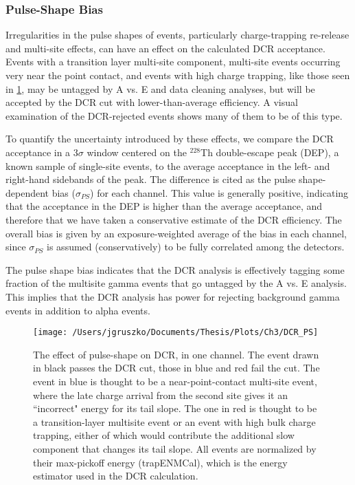 \subsubsection{Pulse-Shape Bias}
Irregularities in the pulse shapes of events, particularly charge-trapping re-release and multi-site effects, can have an effect on the calculated DCR acceptance. Events with a transition layer multi-site component, multi-site events occurring very near the point contact, and events with high charge trapping, like those seen in \ref{fig:DCR_PS}, may be untagged by A vs. E and data cleaning analyses, but will be accepted by the DCR cut with lower-than-average efficiency. A visual examination of the DCR-rejected events shows many of them to be of this type.

To quantify the uncertainty introduced by these effects, we compare the DCR acceptance in a 3$\sigma$ window centered on the $^{228}$Th double-escape peak (DEP), a known sample of single-site events, to the average acceptance in the left- and right-hand sidebands of the peak. The difference is cited as the pulse shape-dependent bias ($\sigma_{PS}$) for each channel. This value is generally positive, indicating that the acceptance in the DEP is higher than the average acceptance, and therefore that we have taken a conservative estimate of the DCR efficiency. The overall bias is given by an exposure-weighted average of the bias in each channel, since $\sigma_{PS}$ is assumed (conservatively) to be fully correlated among the detectors. 

The pulse shape bias indicates that the DCR analysis is effectively tagging some fraction of the multisite gamma events that go untagged by the A vs. E analysis. This implies that the DCR analysis has power for rejecting background gamma events in addition to alpha events.

\begin{figure}[]
 \centering
 \texttt{[image: /Users/jgruszko/Documents/Thesis/Plots/Ch3/DCR\_PS]}
 \caption[Sample waveforms demonstrating the effect of pulse-shape on DCR]{The effect of pulse-shape on DCR, in one channel. The event drawn in black passes the DCR cut, those in blue and red fail the cut. The event in blue is thought to be a near-point-contact multi-site event, where the late charge arrival from the second site gives it an ``incorrect" energy for its tail slope. The one in red is thought to be a transition-layer multisite event or an event with high bulk charge trapping, either of which would contribute the additional slow component that changes its tail slope. All events are normalized by their max-pickoff energy (trapENMCal), which is the energy estimator used in the DCR calculation.} 
 \label{fig:DCR_PS}
\end{figure}

